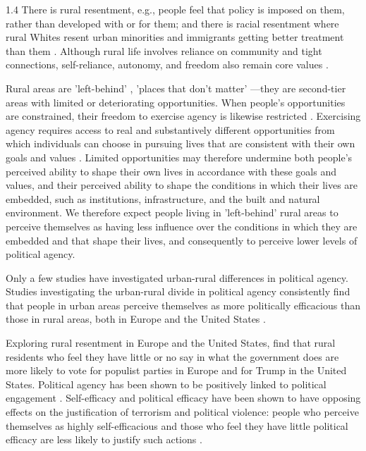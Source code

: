 \documentclass[10pt, letterpaper]{article}
\begin{document}
\begin{spacing}{1.4}
 There is rural resentment, e.g., people feel that policy is imposed on them, rather than developed with or for them; and there is racial resentment where rural Whites resent urban minorities and immigrants getting better treatment than them \citep{diamond23}. %
 Although rural life involves reliance on community and tight connections, self-reliance, autonomy, and freedom also remain core values \citep{diamond23}.


Rural areas are 'left-behind' \citep{ulrich2021people}, 'places that don't matter' \citep{rodriguez2018revenge}%
---they are second-tier areas with limited or deteriorating opportunities. 
When people's opportunities are constrained, their freedom to exercise agency is
likewise restricted \citep{ryan2004autonomy,welzel13}. Exercising agency
requires access to real and substantively different opportunities from which
individuals can choose in pursuing lives that are consistent with their own
goals and values \citep{sen1993markets,sen1999commodities,sen2005human}. Limited opportunities may therefore undermine both people's perceived ability to shape their own lives in
accordance with these goals and values, and their perceived ability to shape the conditions in which their lives are embedded, such as institutions, infrastructure, and the built and natural environment.
We therefore expect people living in 'left-behind' rural areas to perceive themselves as having less influence over the conditions in which they are embedded and that shape their lives, and consequently to perceive lower levels
of political agency. %
 
Only a few studies have investigated urban-rural differences in political
agency. 
 Studies investigating the urban-rural divide in political agency consistently find that people in urban areas perceive themselves as more politically efficacious than those in rural areas, both in Europe \citep{garcia2024they,luukkonen2022urbanisation} and the United States \citep{rowland2024political}.


Exploring rural resentment in Europe and the United States,
\citet{margalit2025cultural} find that rural residents who feel they have little
or no say in what  the government does are more likely to vote for populist parties in Europe and
for Trump in the United States.
%
Political agency has been shown to be positively linked to political engagement \citep{accetta23}.  Self-efficacy and political efficacy have been shown to have opposing effects on the justification of terrorism and political violence: people who perceive themselves as highly self-efficacious and those who feel they have little political efficacy are less likely to justify such actions \citep{julkif2022self}.


\end{spacing}
\end{document}
